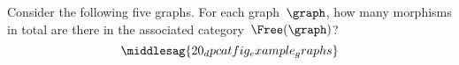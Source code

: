 \vfill
\begin{widepar}
    \begin{gradedexercise}
        \label{ex:HowManyMorphisms}
        Consider the following five graphs.
        For each graph~$\graph$, how many morphisms in total are there in the associated category~$\Free(\graph)$?
        \begin{equation}
            \middlesag{20_dpcatfig_example_graphs}
        \end{equation}
    \end{gradedexercise}
\end{widepar}
